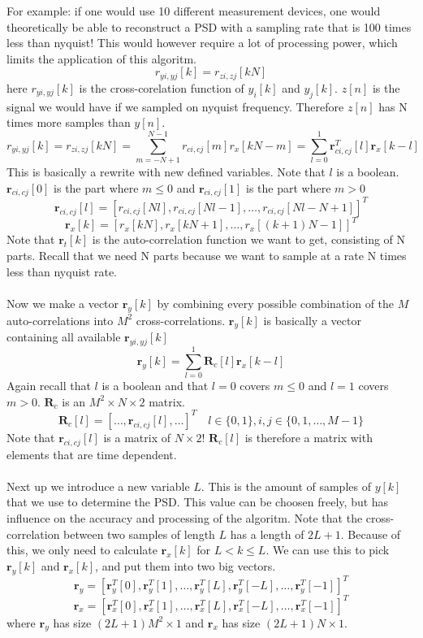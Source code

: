 \documentclass[report, oneside, a4paper, openany]{memoir}
\begin{document}
For example: if  one would use 10 different measurement devices, one would theoretically be able to reconstruct a PSD with a sampling rate that is 100 times less than nyquist! This would however require a lot of processing power, which limits the application of this algoritm.
$$
r_{yi,yj}[k] = r_{zi,zj}[kN]
$$
here $r_{yi,yj}[k]$ is the cross-corelation function of $y_i[k]$ and $y_j[k]$.
$z[n]$ is the signal we would have if we sampled on nyquist frequency. Therefore $z[n]$ has N times more samples than $y[n]$.
$$
r_{yi,yj}[k] = r_{zi,zj}[kN] = \sum_{m=-N+1}^{N-1}r_{ci,cj}[m]r_x[kN-m] = \sum_{l=0}^1\mathbf{r}^T_{ci,cj}[l]\mathbf{r}_x[k-l]
$$
This is basically a rewrite with new defined variables. Note that $l$ is a boolean. $\mathbf{r}_{ci,cj}[0]$ is the part where $m\leq 0$ and $\mathbf{r}_{ci,cj}[1]$ is the part where $m > 0$ 
$$
\mathbf{r}_{ci,cj}[l] = [r_{ci,cj}[Nl], r_{ci,cj}[Nl-1], \dots, r_{ci,cj}[Nl-N+1]]^T
$$
$$
\mathbf{r}_x[k]= [r_x[kN],r_x[kN+1],\dots,r_x[(k+1)N-1]]^T
$$
Note that $\mathbf{r}_t[k]$ is the auto-correlation function we want to get, consisting of N parts. Recall that we need N parts because we want to sample at a rate N times less than nyquist rate.\\
\\
Now we make a vector $\mathbf{r}_y[k]$ by combining every possible combination of the $M$ auto-correlations into $M^2$ cross-correlations. $\mathbf{r}_y[k]$ is basically a vector containing all available $\mathbf{r}_{yi,yj}[k]$
$$
\mathbf{r}_y[k]=\sum_{l=0}^1\mathbf{R}_c[l]\mathbf{r}_x[k-l]
$$
Again recall that $l$ is a boolean and that $l=0$ covers $m\leq 0$ and $l=1$ covers $m > 0$. $\mathbf{R}_c$ is an $M^2 \times N \times 2$ matrix.
$$
\mathbf{R}_c[l] = [\dots,\mathbf{r}_{ci,cj}[l],\dots]^T \quad l \in \{0,1\}, i,j \in \{0,1, \dots, M-1\}
$$
Note that $\mathbf{r}_{ci,cj}[l]$ is a matrix of $N \times 2$! $\mathbf{R}_c[l]$ is therefore a matrix with elements that are time dependent.\\
\\
Next up we introduce a new variable $L$. This is the amount of samples of $y[k]$ that we use to determine the PSD. This value can be choosen freely, 
but has influence on the accuracy and processing of the algoritm. 
Note that the cross-correlation between two samples of length $L$ has a length of $2L+1$. Because of this, we only need to calculate $\mathbf{r}_x[k]$ for $L<k\leq L$. We can use this to pick $\mathbf{r}_y[k]$ and $\mathbf{r}_x[k]$, and put them into two big vectors.
$$
\mathbf{r}_y = [\mathbf{r}^T_y[0],\mathbf{r}^T_y[1],\dots,\mathbf{r}^T_y[L],\mathbf{r}^T_y[-L],\dots,\mathbf{r}^T_y[-1]]^T
$$
$$
\mathbf{r}_x = [\mathbf{r}^T_x[0],\mathbf{r}^T_x[1],\dots,\mathbf{r}^T_x[L],\mathbf{r}^T_x[-L],\dots,\mathbf{r}^T_x[-1]]^T
$$
where $\mathbf{r}_y$ has size $(2L+1)M^2\times 1$ and $\mathbf{r}_x$ has size $(2L+1)N \times 1$. \\
\end{document}
